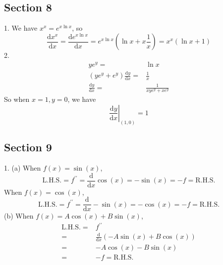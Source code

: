 \subsection{Section 8}
1. We have $x^x=e^{x\ln x}$, so
$$\frac{\mathrm dx^x}{\mathrm dx}=\frac{\mathrm de^{x\ln x}}{\mathrm dx}=e^{x\ln x}(\ln x+x\frac{1}{x})=x^x(\ln x+1)$$
2.
\begin{align*}
    ye^y=&\ln x\\
    (ye^y+e^y)\frac{\mathrm dy}{\mathrm dx}=&\frac{1}{x}\\
    \frac{\mathrm dy}{\mathrm dx}=&\frac{1}{xye^y+xe^y}
\end{align*}
So when $x=1,y=0$, we have
$$\left.\frac{\mathrm dy}{\mathrm dx}\right|_{(1,0)}=1$$

\subsection{Section 9}
1. (a) When $f(x)=\sin(x)$,
$$\mathrm{L.H.S.}=f^{\prime\prime}=\frac{\mathrm d}{\mathrm dx}\cos(x)=-\sin(x)=-f=\mathrm{R.H.S.}$$
When $f(x)=\cos(x)$,
$$\mathrm{L.H.S.}=f^{\prime\prime}=\frac{\mathrm d}{\mathrm dx}-\sin(x)=-\cos(x)=-f=\mathrm{R.H.S.}$$
(b) When $f(x)=A\cos(x)+B\sin(x)$,
\begin{align*}
    \mathrm{L.H.S.}
    =&f^{\prime\prime}\\
    =&\frac{\mathrm d}{\mathrm dx}(-A\sin(x)+B\cos(x))\\
    =&-A\cos(x)-B\sin(x)\\
    =&-f=\mathrm{R.H.S.}
\end{align*}
